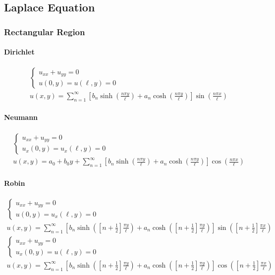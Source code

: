 \subsection{Laplace Equation}
\subsubsection*{Rectangular Region}
\paragraph{Dirichlet}
\begin{gather*}
\begin{cases}
u_{xx} + u_{yy} = 0\\
u(0,y) = u(\ell,y) = 0
\end{cases}\\
u(x,y) = \sum_{n=1}^{\infty}\left[b_{n}\sinh{\left(\frac{n\pi y}{\ell}\right)} +
a_{n}\cosh{\left(\frac{n\pi y}{\ell}\right)}\right]\sin{\left(\frac{n\pi x}{\ell}\right)}
\end{gather*}

\paragraph{Neumann}
\begin{gather*}
\begin{cases}
u_{xx} + u_{yy} = 0\\
u_{x}(0,y) = u_{x}(\ell,y) = 0
\end{cases}\\
u(x,y) = a_{0} + b_{0}y + \sum_{n=1}^{\infty}\left[b_{n}\sinh{\left(\frac{n\pi y}{\ell}\right)} +
a_{n}\cosh{\left(\frac{n\pi y}{\ell}\right)}\right]\cos{\left(\frac{n\pi x}{\ell}\right)}
\end{gather*}

\paragraph{Robin}
\begin{gather*}
\begin{cases}
u_{xx} + u_{yy} = 0\\
u(0,y) = u_{x}(\ell,y) = 0
\end{cases}\\
u(x,y) = \sum_{n=1}^{\infty}\left[b_{n}\sinh{\left(\left[n + \frac{1}{2}\right]\frac{\pi y}{\ell}\right)}
+ a_{n}\cosh{\left(\left[n + \frac{1}{2}\right]\frac{\pi y}{\ell}\right)}\right]\sin{\left(\left[n +
\frac{1}{2}\right]\frac{\pi x}{\ell}\right)}
\end{gather*}
\begin{gather*}
\begin{cases}
u_{xx} + u_{yy} = 0\\
u_{x}(0,y) = u(\ell,y) = 0
\end{cases}\\
u(x,y) = \sum_{n=1}^{\infty}\left[b_{n}\sinh{\left(\left[n + \frac{1}{2}\right]\frac{\pi y}{\ell}\right)}
+ a_{n}\cosh{\left(\left[n + \frac{1}{2}\right]\frac{\pi y}{\ell}\right)}\right]\cos{\left(\left[n +
\frac{1}{2}\right]\frac{\pi x}{\ell}\right)}
\end{gather*}

